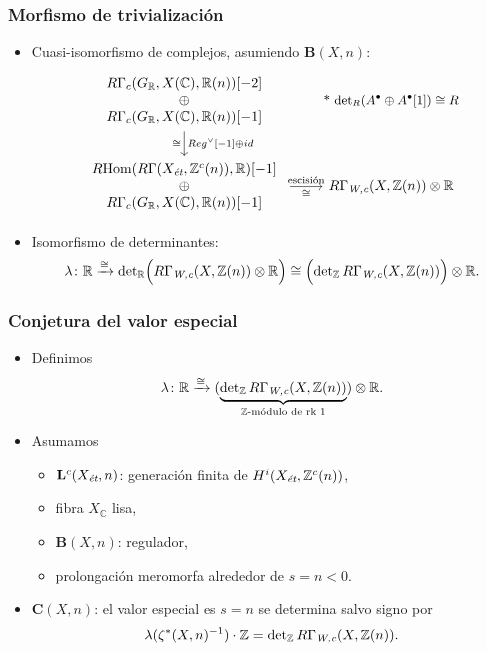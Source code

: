 \documentclass[handout]{beamer}
\newcommand{\CC}{\mathbb{C}}
\newcommand{\RR}{\mathbb{R}}
\newcommand{\ZZ}{\mathbb{Z}}
\DeclareMathOperator{\Hom}{Hom}
\newcommand{\et}{\text{\it ét}}
\newcommand{\Wc}{\text{\it W,c}}
\newcommand{\RHom}{R\!\Hom}
\begin{document}
\begin{frame}
  \frametitle{Morfismo de trivialización}

  \begin{itemize}
  \item<2-> Cuasi-isomorfismo de complejos, asumiendo $\mathbf{B} (X,n)$:
    \[ \begin{tikzcd}[column sep=4em,ampersand replacement=\&]
        \begin{array}{c} R\Gamma_c (G_\RR, X (\CC), \RR (n)) [-2] \\ \oplus \\ R\Gamma_c (G_\RR, X (\CC), \RR (n)) [-1] \end{array} \ar{d}{Reg^\vee [-1] \oplus id}[swap]{\cong} \&[-2em] \text{\small * $\det\nolimits_R (A^\bullet \oplus A^\bullet [1]) \cong R$} \\
        \begin{array}{c} \RHom (R\Gamma (X_\et, \ZZ^c (n)), \RR) [-1] \\ \oplus \\ R\Gamma_c (G_\RR, X (\CC), \RR (n)) [-1] \end{array} \ar{r}{\text{escisión}}[swap]{\cong} \& R\Gamma_\Wc (X, \ZZ (n)) \otimes \RR
      \end{tikzcd} \]

  \item<3-> Isomorfismo de determinantes:
    \[ \lambda\colon \RR \xrightarrow{\cong}
      \det\nolimits_\RR \Bigl(R\Gamma_\Wc (X, \ZZ (n)) \otimes \RR\Bigr) \cong
      \Bigl(\det\nolimits_\ZZ R\Gamma_\Wc (X, \ZZ (n))\Bigr) \otimes \RR. \]
  \end{itemize}
\end{frame}


\begin{frame}
  \frametitle{Conjetura del valor especial}

  \begin{itemize}
  \item<2-> Definimos
  \[ \lambda\colon \RR \xrightarrow{\cong}
    (\underbrace{\det\nolimits_\ZZ R\Gamma_\Wc (X, \ZZ (n))}_{\ZZ\text{-módulo de rk }1}) \otimes \RR. \]

  \item<3-> Asumamos
    \begin{itemize}
    \item $\mathbf{L}^c (X_\et, n)$: generación finita de $H^i (X_\et, \ZZ^c(n))$,
    \item fibra $X_\CC$ lisa,
    \item $\mathbf{B} (X,n)$: regulador,
    \item prolongación meromorfa alrededor de $s = n < 0$.
    \end{itemize}

  \item<4-> $\mathbf{C} (X,n)$: el valor especial es $s = n$ se determina salvo
    signo por
    \[ \lambda (\zeta^* (X,n)^{-1})\cdot \ZZ =
      \det\nolimits_\ZZ R\Gamma_\Wc (X, \ZZ (n)). \]
  \end{itemize}
\end{frame}
\end{document}
